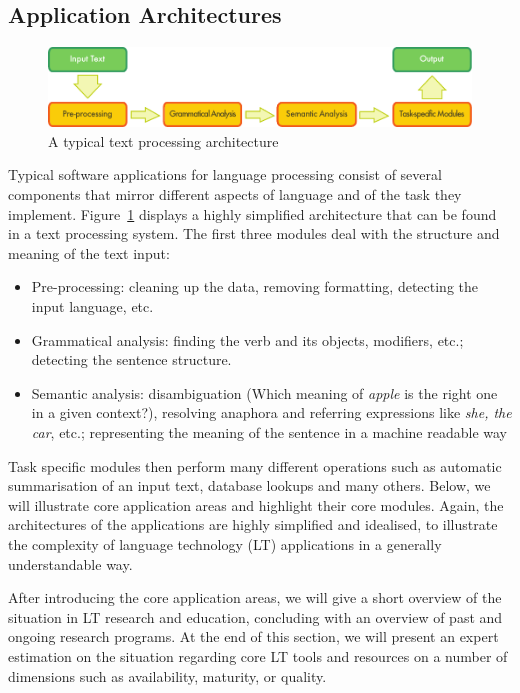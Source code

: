 \begin{multicols}{2}
\subsection{Application Architectures}

\begin{figure}[b]
  \center
  \includegraphics[width=\textwidth]{../_media/english/text_processing_app_architecture}
  \caption{A typical text processing architecture}
  \label{fig:textprocessingarch_en}
\end{figure}

Typical software applications for language processing consist of several components that mirror different aspects of language and of the task they implement. Figure~\ref{fig:textprocessingarch_en} displays a highly simplified architecture that can be found in a text processing system. The first three modules deal with the structure and meaning of the text input:

\begin{itemize}
      \item Pre-processing: cleaning up the data, removing formatting, detecting the input language, etc. 
      \item Grammatical analysis: finding the verb and its objects, modifiers, etc.; detecting the sentence structure.
      \item Semantic analysis: disambiguation (Which meaning of \textit{apple} is the right one in a given context?), resolving anaphora and referring expressions like \textit{she, the car}, etc.; representing the meaning of the sentence in a machine readable way
\end{itemize}

 Task specific modules then perform many different operations such as automatic summarisation of an input text, database lookups and many others. Below, we will illustrate core application areas and highlight their core modules. Again, the architectures of the applications are highly simplified and idealised, to illustrate the complexity of language technology (LT) applications in a generally understandable way. 

After introducing the core application areas, we will give a short overview of the situation in LT research and education, concluding with an overview of past and ongoing research programs. At the end of this section, we will present an expert estimation on the situation regarding core LT tools and resources on a number of dimensions such as availability, maturity, or quality. 


\end{multicols}
